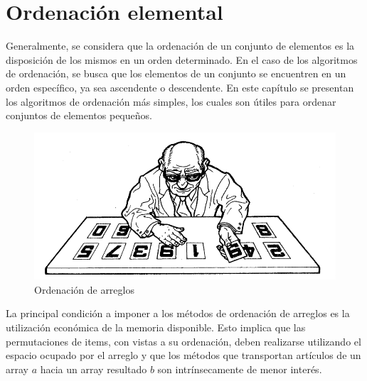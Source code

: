 \chapter{Ordenación elemental}
Generalmente, se considera que la ordenación de un conjunto de elementos es la disposición de los mismos en un orden determinado. En el caso de los algoritmos de ordenación, se busca que los elementos de un conjunto se encuentren en un orden específico, ya sea ascendente o descendente. En este capítulo se presentan los algoritmos de ordenación más simples, los cuales son útiles para ordenar conjuntos de elementos pequeños.

\begin{figure}[h]
\centering
\includegraphics[scale=0.8]{./estáticos/ordenacionArrays.png}
\caption{Ordenación de arreglos}
\end{figure}

La principal condición a imponer a los métodos de ordenación de arreglos es la utilización económica de la memoria disponible. Esto implica que las permutaciones de items, con vistas a su ordenación, deben realizarse utilizando el espacio ocupado por el arreglo y que los métodos que transportan artículos de un array $a$ hacia un array resultado $b$ son intrínsecamente de menor interés.

